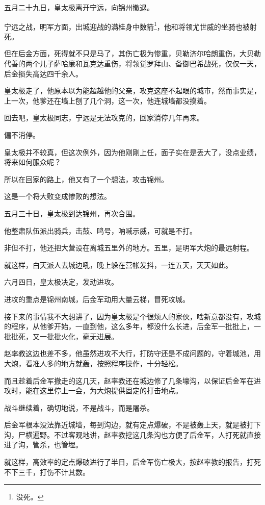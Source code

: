 \begin{multicols}{\theparacolNo}
		五月二十九日，皇太极离开宁远，向锦州撤退。

		宁远之战，明军方面，出城迎战的满桂身中数箭\footnote{没死。}，他和将领尤世威的坐骑也被射死。

		但在后金方面，死得就不只是马了，其伤亡极为惨重，贝勒济尔哈朗重伤，大贝勒代善的两个儿子萨哈廉和瓦克达重伤，将领觉罗拜山、备御巴希战死，仅仅一天，后金损失高达四千余人。

		皇太极走了，他原本以为能超越他的父亲，攻克这座不起眼的城市，然而事实是，上一次，他爹还在墙上刨了几个洞，这一次，他连城墙都没摸着。

		回去吧，皇太极同志，宁远是无法攻克的，回家消停几年再来。

		偏不消停。

		皇太极并不较真，但这次例外，因为他刚刚上任，面子实在是丢大了，没点业绩，将来如何服众呢？

		所以在回家的路上，他又有了一个想法，攻击锦州。

		这是一个将大败变成惨败的想法。

		五月三十日，皇太极到达锦州，再次合围。

		他整肃队伍派出骑兵，击鼓、鸣号，呐喊示威，可就是不打。

		非但不打，他还把大营设在离城五里外的地方。五里，是明军大炮的最远射程。

		就这样，白天派人去城边吼，晚上躲在营帐发抖，一连五天，天天如此。

		六月四日，皇太极决定，发动进攻。

		进攻的重点是锦州南城，后金军动用大量云梯，冒死攻城。

		接下来的事情我不大想讲了，因为皇太极是个很烦人的家伙，啥新意都没有，攻城的程序，从他爹开始，一直到他，这么多年，都没什么长进，后金军一批批上，一批批死，又一批批火化，毫无进展。

		赵率教这边也差不多，他虽然进攻不大行，打防守还是不成问题的，守着城池，用大炮，看准人多的地方就轰，按照程序操作，十分轻松。

		而且趁着后金军撤走的这几天，赵率教还在城边修了几条壕沟，以保证后金军在进攻时，能在这里停上一会，为大炮提供固定的打击地点。

		战斗继续着，确切地说，不是战斗，而是屠杀。

		后金军根本没法靠近城墙，每到沟边，就有定点爆破，不是被轰上天，就是被打下沟，尸横遍野。不过客观地讲，赵率教挖这几条沟也方便了后金军，人打死就直接进了沟，管杀，也管埋。

		就这样，高效率的定点爆破进行了半日，后金军伤亡极大，按赵率教的报告，打死不下三千，打伤不计其数。


\end{multicols}
